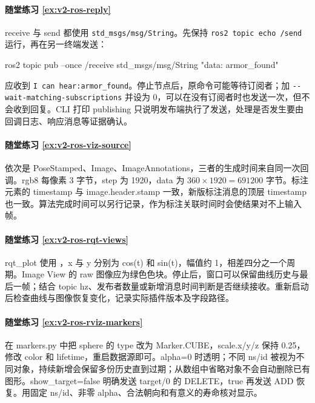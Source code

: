 \paragraph*{随堂练习 \ref{ex:v2-ros-reply}}
\begin{solution}
receive 与 send 都使用 \texttt{std\_msgs/msg/String}。先保持 \texttt{ros2 topic echo /send} 运行，再在另一终端发送：
\begin{tbash}
ros2 topic pub --once /receive std_msgs/msg/String "{data: armor_found}"
\end{tbash}
应收到 \texttt{I can hear:armor\_found}。停止节点后，原命令可能等待订阅者；加 \nolinkurl{--wait-matching-subscriptions} 并设为 0，可以在没有订阅者时也发送一次，但不会收到回复。CLI 打印 publishing 只说明发布端执行了发送，处理是否发生要由回调日志、响应消息等证据确认。
\end{solution}

\paragraph*{随堂练习 \ref{ex:v2-ros-viz-source}}
\begin{solution}
依次是 PoseStamped、Image、ImageAnnotations，三者的生成时间来自同一次回调。rgb8 每像素 3 字节，step 为 1920，data 为 $360\times1920=691200$ 字节。标注元素的 timestamp 与 image.header.stamp 一致，新版标注消息的顶层 timestamp 也一致。算法完成时间可以另行记录，作为标注关联时间时会使结果对不上输入帧。
\end{solution}

\paragraph*{随堂练习 \ref{ex:v2-ros-rqt-views}}
\begin{solution}
rqt\_plot 使用 ，x 与 y 分别为 cos(t) 和 sin(t)，幅值约 1，相差四分之一个周期。Image View 的 raw 图像应为绿色色块。停止后，窗口可以保留曲线历史与最后一帧；结合 topic hz、发布者数量或新增消息时间判断是否继续接收。重新启动后检查曲线与图像恢复变化，记录实际插件版本及字段路径。
\end{solution}

\paragraph*{随堂练习 \ref{ex:v2-ros-rviz-markers}}
\begin{solution}
在 markers.py 中把 sphere 的 type 改为 Marker.CUBE，scale.x/y/z 保持 0.25，修改 color 和 lifetime，重启数据源即可。alpha=0 时透明；不同 ns/id 被视为不同对象，持续新增会保留多份历史直到过期；从数组中省略对象不会自动删除已有图形。show\_target=false 明确发送 target/0 的 DELETE，true 再发送 ADD 恢复。用固定 ns/id、非零 alpha、合法朝向和有意义的寿命核对显示。
\end{solution}

